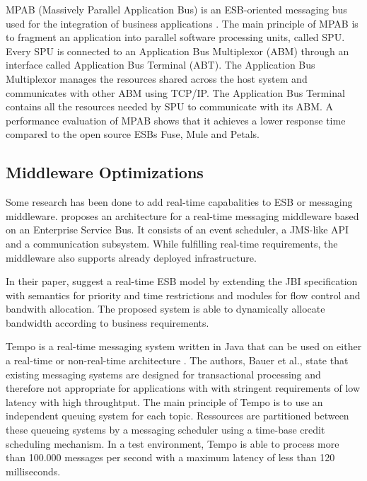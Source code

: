 MPAB (Massively Parallel Application Bus) is an ESB-oriented messaging bus used for the integration of business applications \citep{Benosman:2012zr}. The main principle of MPAB is to fragment an application into parallel software processing units, called SPU. Every SPU is connected to an Application Bus Multiplexor (ABM) through an interface called Application Bus Terminal (ABT). The Application Bus Multiplexor manages the resources shared across the host system and communicates with other ABM using TCP/IP. The Application Bus Terminal contains all the resources needed by SPU to communicate with its ABM. A performance evaluation of MPAB shows that it achieves a lower response time compared to the open source ESBs Fuse, Mule and Petals.

\subsection{Middleware Optimizations}

Some research has been done to add real-time capabalities to ESB or messaging middleware. \cite{Garces-Erice:2009kx} proposes an architecture for a real-time messaging middleware based on an Enterprise Service Bus. It consists of an event scheduler, a \ac{JMS}-like API and a communication subsystem. While fulfilling real-time requirements, the middleware also supports already deployed infrastructure.

In their paper, \cite{Xia:2011rt} suggest a real-time ESB model by extending the JBI specification with semantics for priority and time restrictions and modules for flow control and bandwith allocation. The proposed system is able to dynamically allocate bandwidth according to business requirements.

Tempo is a real-time messaging system written in Java that can be used on either a real-time or non-real-time architecture \citep{Bauer:2008fk}. The authors, Bauer et al., state that existing messaging systems are designed for transactional processing and therefore not appropriate for applications with with stringent requirements of low latency with high throughtput. The main principle of Tempo is to use an independent queuing system for each topic. Ressources are partitioned between these queueing systems by a messaging scheduler using a time-base credit scheduling mechanism. In a test environment, Tempo is able to process more than 100.000 messages per second with a maximum latency of less than 120 milliseconds.


